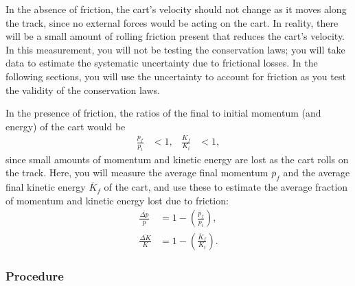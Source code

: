\documentclass[addpoints]{physlabs}
\begin{document}
\begin{labsection}
\begin{experiment}
    In the absence of friction, the cart's velocity should not change as it moves along the track, since no external forces would be acting on the cart. In reality, there will be a small amount of rolling friction present that reduces the cart's velocity. In this measurement, you will not be testing the conservation laws; you will take data to estimate the systematic uncertainty due to frictional losses. In the following sections, you will use the uncertainty to account for friction as you test the validity of the conservation laws.

    In the presence of friction, the ratios of the final to initial momentum (and energy) of the cart would be
    \begin{align*}
        \frac{p_f}{p_i}&<1, & \frac{K_f}{K_i}&<1,
    \end{align*}
    since small amounts of momentum and kinetic energy are lost as the cart rolls on the track. Here, you will measure the average final momentum $\overline{p}_f$ and the average final kinetic energy $\overline{K}_f$ of the cart, and use these to estimate the average fraction of momentum and kinetic energy lost due to friction:
    \begin{align}
        \frac{\overline{\Delta p}}{p} &= 1 - \left(\frac{\overline{p}_f}{p_i}\right), \label{eq: average momentum loss}
        \\
        \frac{\overline{\Delta K}}{K} &= 1 - \left(\frac{\overline{K}_f}{K_i}\right). \label{eq: average energy loss}
    \end{align}

    \setlength{\fboxsep}{6pt}%
    \setlength{\fboxrule}{2pt}%

    \subsubsection*{Procedure}


\end{experiment}
\end{labsection}
\end{document}
